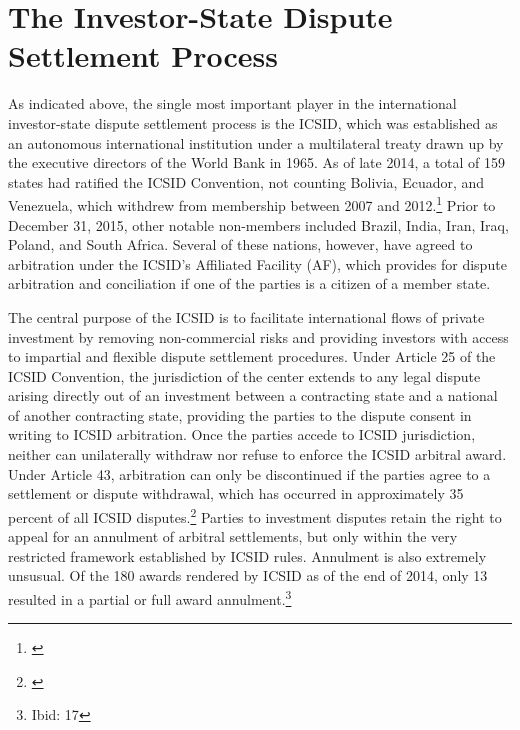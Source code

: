 \documentclass[12pt,onesided]{amsart}
\begin{document}

\section*{The Investor-State Dispute Settlement Process}

As indicated above, the single most important player in the international investor-state dispute settlement process is the ICSID, which was established as an autonomous international institution under a multilateral treaty drawn up by the executive directors of the World Bank in 1965. As of late 2014, a total of 159 states had ratified the ICSID Convention, not counting Bolivia, Ecuador, and Venezuela, which withdrew from membership between 2007 and 2012.\footnote{\citet{icsid:2014b}}  Prior to December 31, 2015, other notable non-members included Brazil, India, Iran, Iraq, Poland, and South Africa. Several of these nations, however, have agreed to arbitration under the ICSID's Affiliated Facility (AF), which provides for dispute arbitration and conciliation if one of the parties is a citizen of a member state. 

The central purpose of the ICSID is to facilitate international flows of private investment by removing non-commercial risks and providing investors with access to impartial and flexible dispute settlement procedures. Under Article 25 of the ICSID Convention, the jurisdiction of the center extends to any legal dispute arising directly out of an investment between a contracting state and a national of another contracting state, providing the parties to the dispute consent in writing to ICSID arbitration. Once the parties accede to ICSID jurisdiction, neither can unilaterally withdraw nor refuse to enforce the ICSID arbitral award. Under Article 43, arbitration can only be discontinued if the parties agree to a settlement or dispute withdrawal, which has occurred in approximately 35 percent of all ICSID disputes.\footnote{\citet[p. 17]{icsid:2015}} Parties to investment disputes retain the right to appeal for an annulment of arbitral settlements, but only within the very restricted framework established by ICSID rules. Annulment is also extremely unsusual. Of the 180 awards rendered by ICSID as of the end of 2014, only 13 resulted in a partial or full award annulment.\footnote{Ibid: 17}
\end{document}
